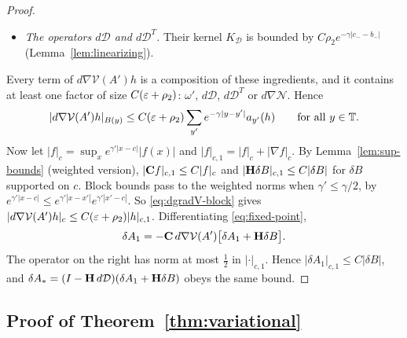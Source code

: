 \begin{proof}
\begin{itemize}
\item \emph{The operators $d\mathcal D$ and $d\mathcal D^T$.} Their kernel $K_{\mathcal D}$ is bounded by $C\rho_2e^{-\gamma|c_--b_-|}$ (Lemma~\ref{lem:linearizing}).
\end{itemize}
Every term of $d\nabla\mathcal V(A')h$ is a composition of these ingredients, and it contains at least one factor of size $C(\varepsilon+\rho_2)$: $\omega'$, $d\mathcal D$, $d\mathcal D^T$ or $d\nabla\mathcal N$. Hence
\begin{equation}\label{eq:dgradV-block}
|d\nabla\mathcal V(A')h|_{B(y)}\le C(\varepsilon+\rho_2)\sum_{y'}e^{-\gamma|y-y'|}a_{y'}(h)\qquad\text{for all }y\in\mathbb T .
\end{equation}
Now let $|f|_c=\sup_xe^{\gamma'|x-c|}|f(x)|$ and $|f|_{c,1}=|f|_c+|\nabla f|_c$. By Lemma~\ref{lem:sup-bounds} (weighted version), $|\mathbf C f|_{c,1}\le C|f|_c$ and $|\mathbf H\delta B|_{c,1}\le C|\delta B|$ for $\delta B$ supported on $c$. Block bounds pass to the weighted norms when $\gamma'\le\gamma/2$, by $e^{\gamma'|x-c|}\le e^{\gamma'|x-x'|}e^{\gamma'|x'-c|}$. So \eqref{eq:dgradV-block} gives $|d\nabla\mathcal V(A')h|_c\le C(\varepsilon+\rho_2)|h|_{c,1}$. Differentiating \eqref{eq:fixed-point},
\[
\delta A_1=-\mathbf C\,d\nabla\mathcal V(A')\big[\delta A_1+\mathbf H\delta B\big].
\]
The operator on the right has norm at most $\frac12$ in $|\cdot|_{c,1}$. Hence $|\delta A_1|_{c,1}\le C|\delta B|$, and $\delta A_*=(I-\mathbf H\,d\mathcal D)(\delta A_1+\mathbf H\delta B)$ obeys the same bound.
\end{proof}

\subsection{Proof of Theorem~\ref{thm:variational}}

